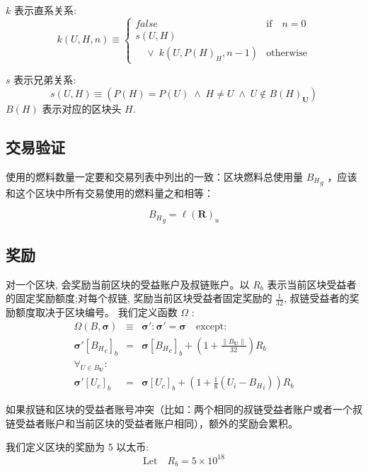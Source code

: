 \documentclass[9pt,oneside]{amsart}
\begin{document}
\begin{multicols}{2}
$k$ 表示直系关系:
\begin{equation}
k(U, H, n) \equiv \begin{cases} false & \text{if} \quad n = 0 \\
s(U, H) &\\
\quad \vee \; k(U, P(H)_H, n - 1) & \text{otherwise}
\end{cases}
\end{equation}

$s$ 表示兄弟关系:
\begin{equation}
s(U, H) \equiv (P(H) = P(U)\; \wedge \; H \neq U \; \wedge \; U \notin B(H)_\mathbf{U})
\end{equation}
$B(H)$ 表示对应的区块头 $H$.

\subsection{交易验证}

使用的燃料数量一定要和交易列表中列出的一致：区块燃料总使用量 ${B_H}_g$ ，应该和这个区块中所有交易使用的燃料量之和相等：

\begin{equation}
{B_H}_g = \ell(\mathbf{R})_u
\end{equation}

\subsection{奖励}
对一个区块, 会奖励当前区块的受益账户及叔链账户。以 $R_b$ 表示当前区块受益者的固定奖励额度;对每个叔链, 奖励当前区块受益者固定奖励的 $\frac{1}{32}$, 叔链受益者的奖励额度取决于区块编号。 我们定义函数 $\Omega$ :
\begin{eqnarray}
\Omega(B, \boldsymbol{\sigma}) & \equiv & \boldsymbol{\sigma}': \boldsymbol{\sigma}' = \boldsymbol{\sigma} \quad \text{except:} \\
\boldsymbol{\sigma}'[{B_H}_c]_b & = & \boldsymbol{\sigma}[{B_H}_c]_b + (1 + \frac{\lVert B_\mathbf{U}\rVert}{32})R_b \\
\forall_{U \in B_\mathbf{U}}: \\ \nonumber
 \boldsymbol{\sigma}'[U_c]_b & = & \boldsymbol{\sigma}[U_c]_b + (1 + \frac{1}{8} (U_i - {B_H}_i)) R_b
\end{eqnarray}

如果叔链和区块的受益者账号冲突（比如：两个相同的叔链受益者账户或者一个叔链受益者账户和当前区块的受益者账户相同），额外的奖励会累积。

我们定义区块的奖励为 5 以太币:
\begin{equation}
\text{Let} \quad R_b = 5 \times 10^{18}
\end{equation}


\end{multicols}
\end{document}
